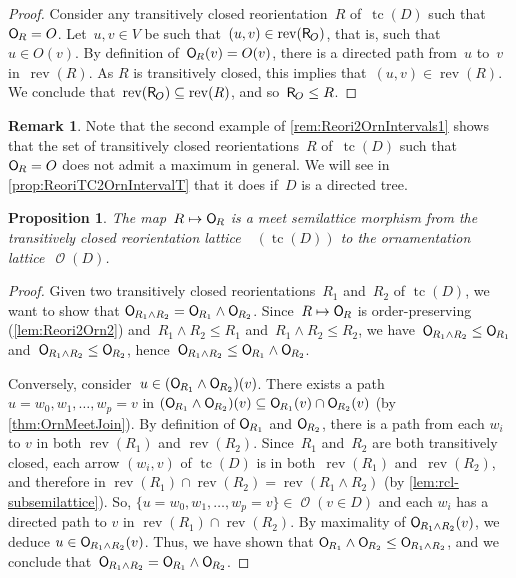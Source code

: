 \documentclass{amsart}
\newtheorem{proposition}[theorem]{Proposition}
\theoremstyle{definition}
\newtheorem{remark}[theorem]{Remark}
\renewcommand{\c}[1]{\mathcal{#1}} %
\DeclareMathOperator{\tc}{tc} %
\newcommand{\meet}{\wedge} %
\newcommand{\mymap}[2]{\mathsf{#1}_{\hspace{-.7pt}#2}}
\DeclareMathOperator{\Orn}{\c{O}}  %
\newcommand{\orn}[1]{\mymap{O}{#1}}  %
\newcommand{\reori}[1]{\mymap{R}{#1}}  %
\DeclareMathOperator{\Rcl}{\c{R}^{cl}}  %
\DeclareMathOperator{\rev}{rev} %
\begin{document}
\begin{proof}
Consider any transitively closed reorientation~$R$ of~$\tc(D)$ such that~$\orn{R} = O$.
Let~$u,v \in V$ be such that~$(u,v) \in \rev(\reori{O})$, that is, such that~$u \in O(v)$.
By definition of~$\orn{R}(v) = O(v)$, there is a directed path from~$u$ to~$v$ in~$\rev(R)$.
As $R$ is transitively closed, this implies that~$(u,v) \in \rev(R)$.
We conclude that~$\rev(\reori{O}) \subseteq \rev(R)$, and so~$\reori{O} \le R$.
\end{proof}

\begin{remark}
\label{rem:Reori2OrnIntervals2}
Note that the second example of \cref{rem:Reori2OrnIntervals1} shows that the set of transitively closed reorientations~$R$ of~$\tc(D)$ such that~$\orn{R} = O$ does not admit a maximum in general.
We will see in \cref{prop:ReoriTC2OrnIntervalT} that it does if~$D$ is a directed tree.
\end{remark}

\begin{proposition}
\label{prop:Reori2OrnMeetSemilaticeTC}
The map~$R \mapsto \orn{R}$ is a meet semilattice morphism from the transitively closed reorientation lattice~$\Rcl(\tc(D))$ to the ornamentation lattice~$\Orn(D)$.
\end{proposition}

\begin{proof}
Given two transitively closed reorientations~$R_1$ and~$R_2$ of $\tc(D)$, we want to show that $\orn{R_1 \meet R_2} = \orn{R_1} \meet \orn{R_2}$.
Since~$R \mapsto \orn{R}$ is order-preserving (\cref{lem:Reori2Orn2}) and~$R_1 \meet R_2 \le R_1$ and~$R_1 \meet R_2 \le R_2$, we have~$\orn{R_1 \meet R_2} \le \orn{R_1}$ and~$\orn{R_1 \meet R_2} \le \orn{R_2}$, hence~$\orn{R_1 \meet R_2} \le \orn{R_1} \meet \orn{R_2}$.

Conversely, consider~$u \in (\orn{R_1} \meet \orn{R_2})(v)$.
There exists a path~$u = w_0, w_1, \dots, w_p = v$ in $(\orn{R_1} \meet \orn{R_2})(v) \subseteq \orn{R_1}(v) \cap \orn{R_2}(v)$ (by \cref{thm:OrnMeetJoin}).
By definition of $\orn{R_1}$ and $\orn{R_2}$, there is a path from each $w_i$ to $v$ in both $\rev(R_1)$ and $\rev(R_2)$.
Since~$R_1$ and~$R_2$ are both transitively closed, each arrow $(w_i,v)$ of $\tc(D)$ is in both~$\rev(R_1)$ and~$\rev(R_2)$,
and therefore in $\rev(R_1) \cap \rev(R_2) = \rev(R_1 \meet R_2)$ (by \cref{lem:rcl-subsemilattice}).
So, $\{u = w_0, w_1, \dots, w_p = v\} \in \Orn(v \in D)$ and each $w_i$ has a directed path to $v$ in $\rev(R_1) \cap \rev(R_2)$.
By maximality of $\orn{R_1 \meet R_2}(v)$, we deduce $u \in \orn{R_1 \meet R_2}(v)$.
Thus, we have shown that $\orn{R_1} \meet \orn{R_2} \le \orn{R_1 \meet R_2}$, and we conclude that~$\orn{R_1 \meet R_2} = \orn{R_1} \meet \orn{R_2}$.
\end{proof}
\end{document}
